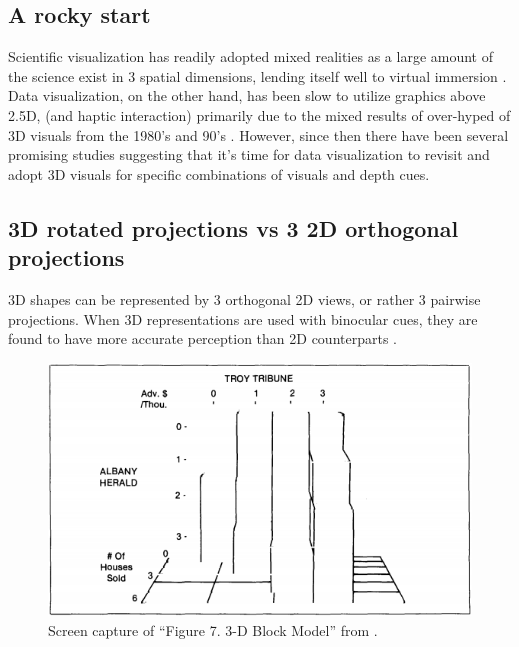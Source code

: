 \documentclass{monashthesis}
\begin{document}
\subsection{A rocky start}\label{a-rocky-start}

Scientific visualization has readily adopted mixed realities as a large
amount of the science exist in 3 spatial dimensions, lending itself well
to virtual immersion \autocite{marriott_immersive_2018}. Data
visualization, on the other hand, has been slow to utilize graphics
above 2.5D, (and haptic interaction) primarily due to the mixed results
of over-hyped of 3D visuals from the 1980's and 90's
\autocite{munzner_visualization_2014}. However, since then there have
been several promising studies suggesting that it's time for data
visualization to revisit and adopt 3D visuals for specific combinations
of visuals and depth cues.

\subsection{3D rotated projections vs 3 2D orthogonal
projections}\label{d-rotated-projections-vs-3-2d-orthogonal-projections}

3D shapes can be represented by 3 orthogonal 2D views, or rather 3
pairwise projections. When 3D representations are used with binocular
cues, they are found to have more accurate perception than 2D
counterparts \autocite[depicted in figure
\ref{fig:lee86fig}]{lee_effects_1986}.




\begin{figure}

{\centering \includegraphics[width=0.7\linewidth]{./figures/lee86fig} 

}

\caption{Screen capture of ``Figure 7. 3-D Block Model'' from
\textcite{lee_effects_1986}.}\label{fig:lee86fig}
\end{figure}
\end{document}
